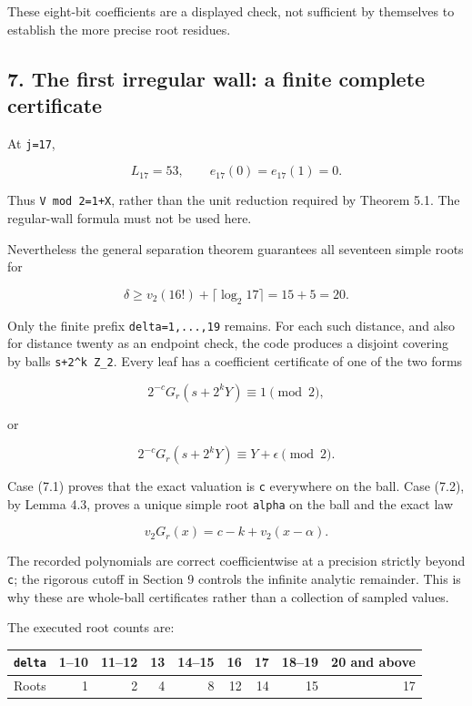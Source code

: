 \documentclass[11pt,letterpaper]{article}
\begin{document}
These eight-bit coefficients are a displayed check, not sufficient by themselves to establish the more precise root residues.

\subsection{7. The first irregular wall: a finite complete certificate}\label{the-first-irregular-wall-a-finite-complete-certificate}

At \texttt{j=17},

\[
L_{17}=53,\qquad e_{17}(0)=e_{17}(1)=0.
\]

Thus \texttt{V\ mod\ 2=1+X}, rather than the unit reduction required by Theorem 5.1. The regular-wall formula must not be used here.

Nevertheless the general separation theorem guarantees all seventeen simple roots for

\[
\delta\ge v_2(16!)+\lceil\log_2 17\rceil=15+5=20.
\]

Only the finite prefix \texttt{delta=1,...,19} remains. For each such distance, and also for distance twenty as an endpoint check, the code produces a disjoint covering by balls \texttt{s+2\^{}k\ Z\_2}. Every leaf has a coefficient certificate of one of the two forms

\[
2^{-c}G_r(s+2^kY)\equiv1\pmod2, \tag{7.1}
\]

or

\[
2^{-c}G_r(s+2^kY)\equiv Y+\epsilon\pmod2. \tag{7.2}
\]

Case (7.1) proves that the exact valuation is \texttt{c} everywhere on the ball. Case (7.2), by Lemma 4.3, proves a unique simple root \texttt{alpha} on the ball and the exact law

\[
v_2G_r(x)=c-k+v_2(x-\alpha).
\]

The recorded polynomials are correct coefficientwise at a precision strictly beyond \texttt{c}; the rigorous cutoff in Section 9 controls the infinite analytic remainder. This is why these are whole-ball certificates rather than a collection of sampled values.

The executed root counts are:

\begin{longtable}[]{@{}lrrrrrrrr@{}}
\toprule\noalign{}
\texttt{delta} & 1--10 & 11--12 & 13 & 14--15 & 16 & 17 & 18--19 & 20 and above \\
\midrule\noalign{}
\endhead
\bottomrule\noalign{}
\endlastfoot
Roots & 1 & 2 & 4 & 8 & 12 & 14 & 15 & 17 \\
\end{longtable}
\end{document}

